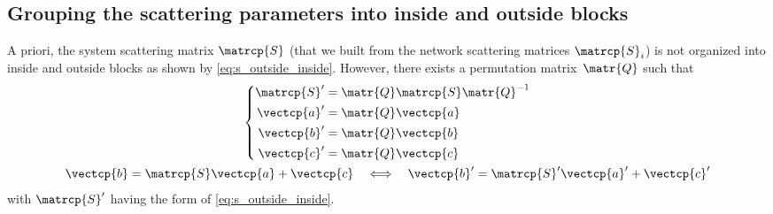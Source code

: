 \begin{refsection}
\subsection{Grouping the scattering parameters into inside and outside blocks}
A priori, the system scattering matrix $\matrcp{S}$ (that we built from the network scattering matrices $\matrcp{S}_i$) is not organized into inside and outside blocks as shown by \cref{eq:s_outside_inside}.
However, there exists a permutation matrix~$\matr{Q}$ such that
\begin{gather}
    \left\lbrace
    \begin{aligned}
        \matrcp{S}' &= \matr{Q} \matrcp{S} \matr{Q}^{-1} \\
        \vectcp{a}' &= \matr{Q} \vectcp{a} \\
        \vectcp{b}' &= \matr{Q} \vectcp{b} \\
        \vectcp{c}' &= \matr{Q} \vectcp{c}
    \end{aligned}
    \right.
    \label{eq:permute_s}
    \\
    \vectcp{b} = \matrcp{S} \vectcp{a} + \vectcp{c}
    \quad \Longleftrightarrow \quad
    \vectcp{b}' = \matrcp{S}' \vectcp{a}' + \vectcp{c}'
    \label{eq:permute_s_equiv}
\end{gather}
with $\matrcp{S}'$ having the form of \cref{eq:s_outside_inside}.


\end{refsection}
